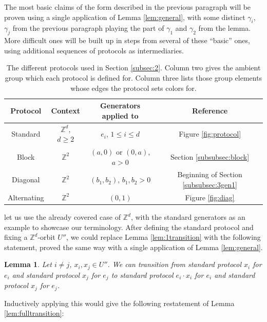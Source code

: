 \documentclass[12pt]{article}
\newcommand{\0}{\varnothing}
\newcommand{\Z}{\mathbb{Z}}
\newtheorem{lemma}{Lemma}
\begin{document}
The most basic claims of the form described in the previous paragraph will be proven using a single application of Lemma \ref{lem:general}, with some distinct $\gamma_i$, $\gamma_j$ from the previous paragraph playing the part of $\gamma_1$ and $\gamma_2$ from the lemma. More difficult ones will be built up in steps from several of these ``basic'' ones, using additional sequences of protocols as intermediaries. 


\begin{table}[]
    \centering
    \begin{tabular}{| c | c | c | c |}
        \hline 
        Protocol & Context & Generators applied to & Reference \\
        \hline
        \hline
        Standard & $\Z^d$, $d \geq 2$ & $e_i$, $1 \leq i \leq d$ & Figure \ref{fig:protocol} \\
        \hline
        Block & $\Z^2$ & $(a,0)$ or $(0,a)$, $a > 0$ & Section \ref{subsubsec:block} \\
        \hline
        Diagonal & $\Z^2$ & $(b_1,b_2)$, $b_1,b_2 > 0$ & Beginning of Section \ref{subsubsec:3gen1} \\
        \hline
        Alternating & $\Z^2$ & $(0,1)$ & Figure \ref{fig:diag} \\
        \hline
    \end{tabular}
    \caption{The different protocols used in Section \ref{subsec:2}. Column two gives the ambient group which each protocol is defined for. Column three lists those group elements whose edges the protocol sets colors for.}
    \label{tab:protocols}
\end{table}

let us use the already covered case of $\Z^d$, with the standard generators as an example to showcase our terminology. After defining the standard protocol and fixing a $\Z^d$-orbit $U''$, we could replace Lemma \ref{lem:1transition} with the following statement, proved the same way with a single application of Lemma \ref{lem:general}.

\begin{lemma}
Let $i \neq j$, $x_i,x_j \in U''$. We can transition from standard protocol $x_i$ for $e_i$ and standard protocol $x_j$ for $e_j$ to standard protocol $e_i \cdot x_i$ for $e_i$ and standard protocol $x_j$ for $e_j$.
\end{lemma}

Inductively applying this would give the following restatement of Lemma \ref{lem:fulltransition}:
\end{document}
